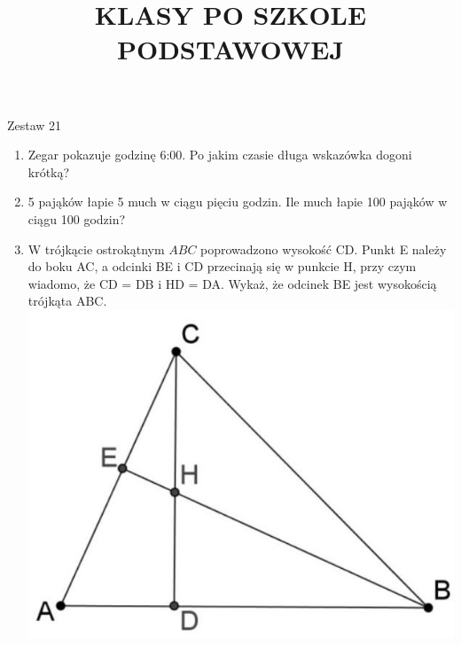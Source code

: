 \documentclass[10pt]{article}
\title{KLASY PO SZKOLE PODSTAWOWEJ }
\author{}
\date{}
\begin{document}
\maketitle
Zestaw 21

\begin{enumerate}
  \item Zegar pokazuje godzinę 6:00. Po jakim czasie długa wskazówka dogoni krótką?
  \item 5 pająków łapie 5 much w ciągu pięciu godzin. Ile much łapie 100 pająków w ciągu 100 godzin?
  \item W trójkącie ostrokątnym \(A B C\) poprowadzono wysokość CD. Punkt E należy do boku AC, a odcinki BE i CD przecinają się w punkcie H, przy czym wiadomo, że CD = DB i HD = DA. Wykaż, że odcinek BE jest wysokością trójkąta ABC.\\
\includegraphics[max width=\textwidth, center]{2024_11_21_b91e86a5070ac23144a8g-1(1)}
\end{enumerate}
\end{document}
